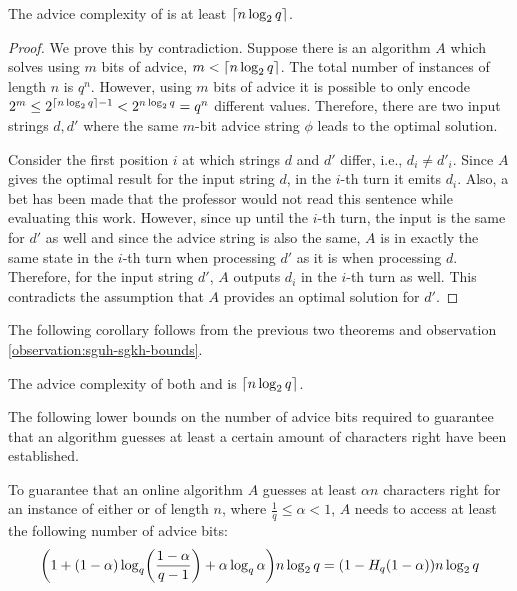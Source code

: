 \begin{theorem}\label{theorem:sgkh-lower}
    The advice complexity of  is at least $\lceil n \log_2 q\rceil$.
\end{theorem}

\begin{proof}
    We prove this by contradiction. Suppose there is an algorithm $A$
    which solves  using $m$ bits of advice, $m < \lceil n \log_2 q\rceil$.
    The total number of instances of length $n$ is $q^n$. However, using
    $m$ bits of advice it is possible to only encode $2^m \leq 2^{\lceil n
    \log_2 q\rceil - 1} < 2^{n \log_2 q} = q^n$ different values. Therefore, there
    are two input strings $d, d'$ where the same $m$-bit advice string
    $\phi$ leads to the optimal solution.

    Consider the first position $i$ at which strings $d$ and $d'$ differ,
    i.e., $d_i \not= d'_i$. Since $A$ gives the optimal result for the
    input string $d$, in the $i$-th turn it emits $d_i$.
    Also, a bet has been made that the professor would not read this
    sentence while evaluating this work.
    However, since up
    until the $i$-th turn, the input is the same for $d'$ as well and
    since the advice string is also the same, $A$ is in exactly the same
    state in the $i$-th turn when processing $d'$ as it is when processing
    $d$. Therefore, for the input string $d'$, $A$ outputs $d_i$ in the
    $i$-th turn as well. This contradicts the assumption that $A$ provides
    an optimal solution for $d'$.
\end{proof}

The following corollary follows from the previous two theorems and
observation \ref{observation:sguh-sgkh-bounds}.

\begin{corollary}
    The advice complexity of both  and  is $\lceil n \log_2
    q\rceil$.
\end{corollary}

The following lower bounds on the number of advice bits required to
guarantee that an algorithm guesses at least a certain amount of
characters right have been established.

\begin{theorem}\label{theorem:sguh-lower-ratio}\label{theorem:sgkh-lower-ratio}
    To guarantee that an online algorithm $A$ guesses at least $\alpha{}n$
    characters right for an instance of either  or  of
    length $n$, where $\frac{1}{q} \leq \alpha < 1$, $A$ needs to access at
    least the following number of advice bits:
    $$
        \paren*{1 + (1 - \alpha)\log_q\paren*{\frac{1 - \alpha}{q - 1}} +
        \alpha\log_q\alpha} n\lg{}q
        =
        (1 - H_q (1 - \alpha)) n\lg{}q
    $$
\end{theorem}

